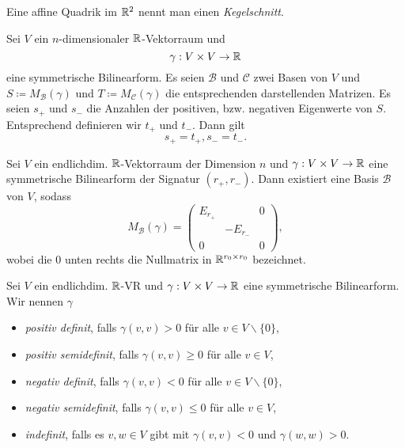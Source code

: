 \documentclass{cheat-sheet}
\newcommand{\BB}{\mathcal{B}}
\newcommand{\BC}{\mathcal{C}}
\begin{document}
\begin{defn}
Eine affine Quadrik im $\mathbb{R}^2$ nennt man einen \emph{Kegelschnitt}.
\end{defn}


\begin{satz}
Sei $V$ ein $n$-dimensionaler $\mathbb{R}$-Vektorraum und
\[ \gamma : V \times V \to \mathbb{R} \]
eine symmetrische Bilinearform. Es seien $\BB$ und $\BC$ zwei Basen von $V$ und $S \coloneqq M_\BB(\gamma)$ und $T \coloneqq M_{\BC}(\gamma)$ die entsprechenden darstellenden Matrizen. Es seien $s_+$ und $s_-$ die Anzahlen der positiven, bzw. negativen Eigenwerte von $S$. Entsprechend definieren wir $t_+$ und $t_-$. Dann gilt
\[ s_+ = t_+, s_- = t_-. \]
\end{satz}

\begin{kor}
Sei $V$ ein endlichdim. $\mathbb{R}$-Vektorraum der Dimension $n$ und $\gamma : V \times V \to \mathbb{R}$ eine symmetrische Bilinearform der Signatur $(r_+, r_-)$. Dann existiert eine Basis $\BB$ von $V$, sodass
\[ M_{\BB}(\gamma) = \begin{pmatrix}
E_{r_+} && 0 \\
& - E_{r_-} & \\
0 && 0
\end{pmatrix}, \]
wobei die $0$ unten rechts die Nullmatrix in $\mathbb{R}^{r_0 \times r_0}$ bezeichnet.
\end{kor}

\begin{defn}
Sei $V$ ein endlichdim. $\mathbb{R}$-VR und $\gamma : V \times V \to \mathbb{R}$ eine symmetrische Bilinearform. Wir nennen $\gamma$
\begin{itemize}
  \item \emph{positiv definit}, falls $\gamma(v, v) > 0$ für alle $v \in V \backslash \{ 0 \}$,
  \item \emph{positiv semidefinit}, falls $\gamma(v, v) \ge 0$ für alle $v \in V$,
  \item \emph{negativ definit}, falls $\gamma(v, v) < 0$ für alle $v \in V \backslash \{ 0 \}$,
  \item \emph{negativ semidefinit}, falls $\gamma(v, v) \le 0$ für alle $v \in V$,
  \item \emph{indefinit}, falls es $v, w \in V$ gibt mit $\gamma(v, v) < 0$ und $\gamma(w, w) > 0$.
\end{itemize}
\end{defn}
\end{document}
